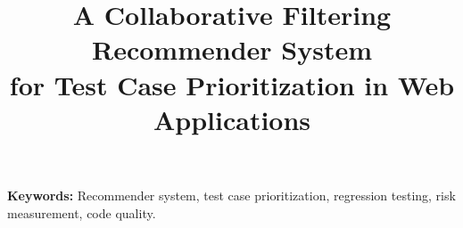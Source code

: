 \documentclass[10pt,conference]{IEEEtran}
\begin{document}


\pagestyle{plain}

 \title{A Collaborative Filtering Recommender System \\ 
for Test Case Prioritization in Web Applications}

\author{
	\and
}



\maketitle
\thispagestyle{empty}




\textbf{Keywords: }{Recommender system, test case prioritization, 
regression testing, risk measurement, code quality.}

%









%



\end{document}
